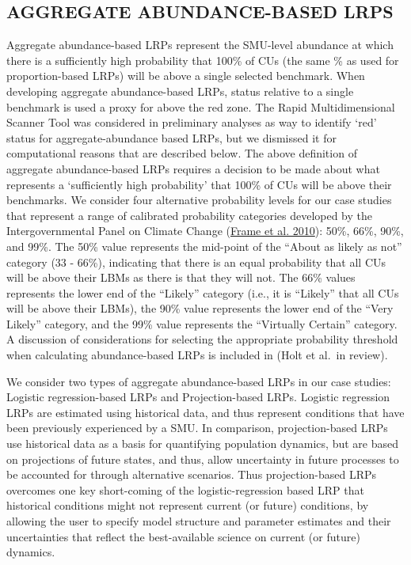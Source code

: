 \documentclass[11pt]{book}
\begin{document}
\hypertarget{aggAbundMethods}{%
\subsection{AGGREGATE ABUNDANCE-BASED LRPS}\label{aggAbundMethods}}

Aggregate abundance-based LRPs represent the SMU-level abundance at which there is a sufficiently high probability that 100\% of CUs (the same \% as used for proportion-based LRPs) will be above a single selected benchmark. When developing aggregate abundance-based LRPs, status relative to a single benchmark is used a proxy for above the red zone. The Rapid Multidimensional Scanner Tool was considered in preliminary analyses as way to identify `red' status for aggregate-abundance based LRPs, but we dismissed it for computational reasons that are described below. The above definition of aggregate abundance-based LRPs requires a decision to be made about what represents a `sufficiently high probability' that 100\% of CUs will be above their benchmarks. We consider four alternative probability levels for our case studies that represent a range of calibrated probability categories developed by the Intergovernmental Panel on Climate Change (\protect\hyperlink{ref-frameGuidanceNoteLead2010}{Frame et al. 2010}): 50\%, 66\%, 90\%, and 99\%. The 50\% value represents the mid-point of the ``About as likely as not'' category (33 - 66\%), indicating that there is an equal probability that all CUs will be above their LBMs as there is that they will not. The 66\% values represents the lower end of the ``Likely'' category (i.e., it is ``Likely'' that all CUs will be above their LBMs), the 90\% value represents the lower end of the ``Very Likely'' category, and the 99\% value represents the ``Virtually Certain'' category. A discussion of considerations for selecting the appropriate probability threshold when calculating abundance-based LRPs is included in (Holt et al.~in review).

We consider two types of aggregate abundance-based LRPs in our case studies: Logistic regression-based LRPs and Projection-based LRPs. Logistic regression LRPs are estimated using historical data, and thus represent conditions that have been previously experienced by a SMU. In comparison, projection-based LRPs use historical data as a basis for quantifying population dynamics, but are based on projections of future states, and thus, allow uncertainty in future processes to be accounted for through alternative scenarios. Thus projection-based LRPs overcomes one key short-coming of the logistic-regression based LRP that historical conditions might not represent current (or future) conditions, by allowing the user to specify model structure and parameter estimates and their uncertainties that reflect the best-available science on current (or future) dynamics.
\end{document}
